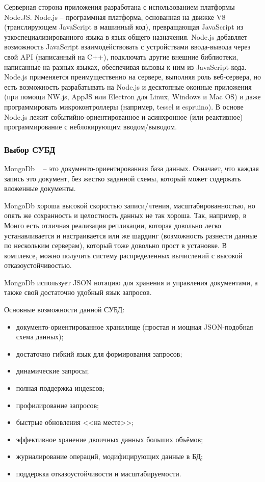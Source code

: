 Серверная сторона приложения разработана с использованием платформы Node.JS.
Node.js -- программная платформа, основанная на движке V8 (транслирующем JavaScript в машинный код), превращающая JavaScript из узкоспециализированного языка в язык общего назначения. Node.js добавляет возможность JavaScript взаимодействовать с устройствами ввода-вывода через свой API (написанный на C++), подключать другие внешние библиотеки, написанные на разных языках, обеспечивая вызовы к ним из JavaScript-кода. Node.js применяется преимущественно на сервере, выполняя роль веб-сервера, но есть возможность разрабатывать на Node.js и десктопные оконные приложения (при помощи NW.js, AppJS или Electron для Linux, Windows и Mac OS) и даже программировать микроконтроллеры (например, tessel и espruino). В основе Node.js лежит событийно-ориентированное и асинхронное (или реактивное) программирование с неблокирующим вводом/выводом.

\subsubsection{Выбор СУБД}

MongoDb ~\cite{mongodb} -- это документо-ориентированная база данных. Означает, что каждая запись это документ, без жестко заданной схемы, который может содержать вложенные документы.

MongoDb хороша высокой скоростью записи/чтения, масштабированностью, но опять же сохранность и целостность данных не так хороша. Так, например, в Монго есть отличная реализация репликации, которая довольно легко устанавливается и настраивается или же шардинг (возможность разнести данные по нескольким серверам), который тоже довольно прост в установке. В комплексе, можно получить систему распределенных вычислений с высокой отказоустойчивостью.

MongoDb использует JSON нотацию для хранения и управления документами, а также свой достаточно удобный язык запросов.

Основные возможности данной СУБД:
\begin{itemize}
  \item документо-ориентированное хранилище (простая и мощная JSON-подобная схема данных);
  \item достаточно гибкий язык для формирования запросов;
  \item динамические запросы;
  \item полная поддержка индексов;
  \item профилирование запросов;
  \item быстрые обновления <<на месте>>;
  \item эффективное хранение двоичных данных больших объёмов;
  \item журналирование операций, модифицирующих данные в БД;
  \item поддержка отказоустойчивости и масштабируемости.
\end{itemize}

